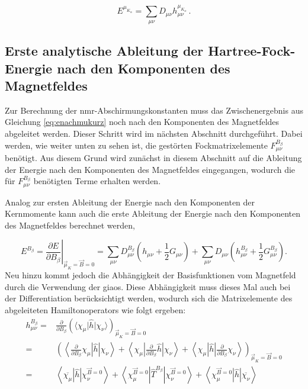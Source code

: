 	\begin{equation}\label{eq:enachmukurz}
	E^{\mu_{K_\alpha}}=\sum_{\mu\nu}D_{\mu\nu}h_{\mu\nu}^{\mu_{K_\alpha}}\, .
	\end{equation}
	
\subsection{Erste analytische Ableitung der Hartree-Fock-Energie nach den Komponenten des Magnetfeldes}
	Zur Berechnung der \ac{nmr}-Abschirmungskonstanten muss das Zwischenergebnis aus Gleichung \ref{eq:enachmukurz} noch nach den Komponenten des Magnetfeldes abgeleitet werden. Dieser Schritt wird im nächsten Abschnitt durchgeführt. Dabei werden, wie weiter unten zu sehen ist, die gestörten Fockmatrixelemente $F_{\mu\nu}^{B_\beta}$ benötigt. Aus diesem Grund wird zunächst in diesem Abschnitt auf die Ableitung der Energie nach den Komponenten des Magnetfeldes eingegangen, wodurch die für $F_{\mu\nu}^{B_\beta}$ benötigten Terme erhalten werden.
	
	Analog zur ersten Ableitung der Energie nach den Komponenten der Kernmomente kann auch die erste Ableitung der Energie nach den Komponenten des Magnetfeldes berechnet werden,
	
	\begin{equation}\label{eq:enachb}
  	  E^{B_\beta}=\left.\frac{\partial E}{\partial B_\beta}\right|_{\vec{\mu}_K=\vec{B}=0}=\sum_{\mu\nu}D_{\mu\nu}^{B_\beta}\left(h_{\mu\nu}+\frac{1}{2}G_{\mu\nu}\right)+\sum_{\mu\nu}D_{\mu\nu}\left(h_{\mu\nu}^{B_\beta}+\frac{1}{2}G_{\mu\nu}^{B_\beta}\right).
  	\end{equation}
  	Neu hinzu kommt jedoch die Abhängigkeit der Basisfunktionen vom Magnetfeld durch die Verwendung der \acp{giao}. Diese Abhängigkeit muss dieses Mal auch bei der Differentiation berücksichtigt werden, wodurch sich die Matrixelemente des abgeleiteten Hamiltonoperators wie folgt ergeben:	
  	     \begin{equation}
     \begin{aligned}
       h_{\mu\nu}^{B_\beta}=&\frac{\partial}{\partial B_\beta}\left(\langle\chi_\mu\vert\hat{h}\vert\chi_\nu\rangle\right)_{\vec{\mu}_K=\vec{B}=0}\\
       =&\left(\left\langle\frac{\partial}{\partial B_\beta}\chi_\mu\left\vert\hat{h}\right\vert\chi_\nu\right\rangle
        +\left\langle\chi_\mu\left\vert\frac{\partial}{\partial B_\beta}\hat{h}\right\vert\chi_\nu\right\rangle
        +\left\langle\chi_\mu\left\vert\hat{h}\right\vert\frac{\partial}{\partial B_\beta}\chi_\nu\right\rangle\right)_{\vec{\mu}_K=\vec{B}=0}\\
       =&\left\langle\overline{\chi_\mu}\left\vert\hat{h}\right\vert\chi_\nu^{\vec{B}=0}\right\rangle
        +\left\langle\chi_\mu^{\vec{B}=0}\left\vert\hat{T}^{B_\beta}\right\vert\chi_\nu^{\vec{B}=0}\right\rangle
        +\left\langle\chi_\mu^{\vec{B}=0}\left\vert\hat{h}\right\vert\overline{\chi_\nu}\right\rangle
     \end{aligned}
     \end{equation}
     
